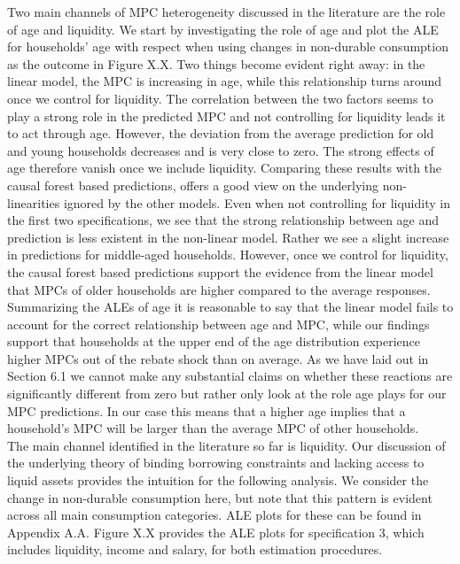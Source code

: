 Two main channels of MPC heterogeneity discussed in the literature are the role of age and liquidity. We start by investigating the role of age and plot the ALE for households' age with respect when using changes in non-durable consumption as the outcome in Figure X.X. Two things become evident right away: in the linear model, the MPC is increasing in age, while this relationship turns around once we control for liquidity. The correlation between the two factors seems to play a strong role in the predicted MPC and not controlling for liquidity leads it to act through age. However, the deviation from the average prediction for old and young households decreases and is very close to zero. The strong effects of age therefore vanish once we include liquidity. Comparing these results with the causal forest based predictions, offers a good view on the underlying non-linearities ignored by the other models. Even when not controlling for liquidity in the first two specifications, we see that the strong relationship between age and prediction is less existent in the non-linear model. Rather we see a slight increase in predictions for middle-aged households. However, once we control for liquidity, the causal forest based predictions support the evidence from the linear model that MPCs of older households are higher compared to the average responses. Summarizing the ALEs of age it is reasonable to say that the linear model fails to account for the correct relationship between age and MPC, while our findings support that households at the upper end of the age distribution experience higher MPCs out of the rebate shock than on average. As we have laid out in Section 6.1 we cannot make any substantial claims on whether these reactions are significantly different from zero but rather only look at the role age plays for our MPC predictions. In our case this means that a higher age implies that a household's MPC will be larger than the average MPC of other households. \\
The main channel identified in the literature so far is liquidity. Our discussion of the underlying theory of binding borrowing constraints and lacking access to liquid assets provides the intuition for the following analysis. We consider the change in non-durable consumption here, but note that this pattern is evident across all main consumption categories. ALE plots for these can be found in Appendix A.A. Figure X.X provides the ALE plots for specification 3, which includes liquidity, income and salary, for both estimation procedures. \\
